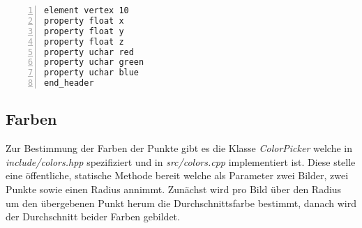 \begin{lstlisting}[numbers=left, breaklines=true, breakatwhitespace=false, label=lst:ply_vertex_element, caption=Beispiel PLY Header für 10 Vertex Elemente mit den Attributen Position und Farbe]
element vertex 10
property float x
property float y
property float z
property uchar red
property uchar green
property uchar blue
end_header
\end{lstlisting}

\subsection{Farben}
Zur Bestimmung der Farben der Punkte gibt es die Klasse \emph{ColorPicker} welche in \emph{include/colors.hpp} spezifiziert und in \emph{src/colors.cpp} implementiert ist.
Diese stelle eine öffentliche, statische Methode bereit welche als Parameter zwei Bilder, zwei Punkte sowie einen Radius annimmt.
Zunächst wird pro Bild über den Radius um den übergebenen Punkt herum die Durchschnittsfarbe bestimmt, danach wird der Durchschnitt beider Farben gebildet.